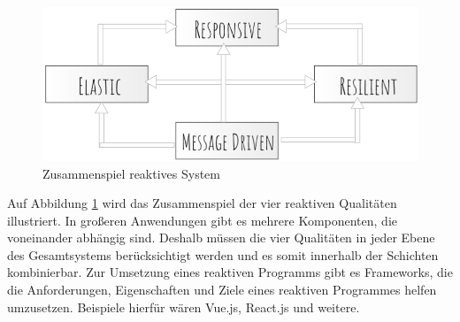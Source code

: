 \begin{figure}[h] 
\centering
\includegraphics[scale=0.5]{fig/reaktiveSystem.png} 
\caption{Zusammenspiel reaktives System}
\label{fig:RS}
\end{figure} 

Auf Abbildung \ref{fig:RS} wird das Zusammenspiel der vier reaktiven Qualit\"aten illustriert. In gro\ss{}eren Anwendungen gibt es mehrere Komponenten, die voneinander abh\"angig sind. Deshalb m\"ussen die vier Qualit\"aten in jeder Ebene des Gesamtsystems ber\"ucksichtigt werden und es somit innerhalb der Schichten kombinierbar\cite{ReaktiveManifest2014}.
Zur Umsetzung eines reaktiven Programms gibt es Frameworks, die die Anforderungen, Eigenschaften und Ziele eines reaktiven Programmes helfen umzusetzen. Beispiele hierf\"ur w\"aren Vue.js, React.js und weitere.